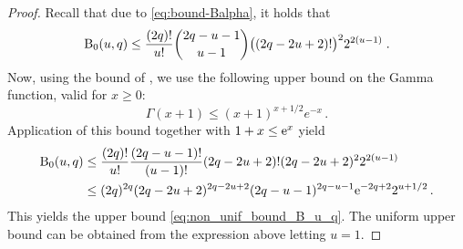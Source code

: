 \begin{proof}
Recall that due to \eqref{eq:bound-Balpha}, it holds that
\[
\operatorname{B}_{0}(u,q)
\leq \frac{(2q)!}{u!} \binom{2q-u-1}{u-1} \bigl((2q-2u+2)!\bigr)^{2} 2^{2(u-1)}\;.
\]
Now, using the bound of \cite[Theorem~2]{guo_gamma_func}, we use the following upper bound on the Gamma function, valid for $x \geq 0$:
\[
\Gamma(x+1) \leq (x+1)^{x+1/2}e^{-x}\,.
\]
Application of this bound together with $1 + x \leq \mathrm{e}^{x}$ yield 
\begin{align*}
\operatorname{B}_{0}(u,q) 
&\leq \frac{(2q)!}{u!} \frac{(2q-u-1)!}{(u-1)!} (2q-2u+2)! (2q-2u+2)^{2} 2^{2(u-1)} \\
&\leq (2q)^{2q} (2q-2u+2)^{2q-2u+2} (2q-u-1)^{2q-u-1} \mathrm{e}^{-2q+2} 2^{u+1/2}\,.
\end{align*}
This yields the upper bound \eqref{eq:non_unif_bound_B_u_q}. 
The uniform upper bound can be obtained from the expression above letting $u = 1$.
\end{proof}

